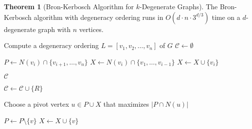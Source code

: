\documentclass{article}
\theoremstyle{definition}
\newtheorem{theorem}{Theorem}
\begin{document}
\begin{theorem}[Bron-Kerbosch Algorithm for $k$-Degenerate Graphs]
The Bron-Kerbosch algorithm with degeneracy ordering runs in $O(d \cdot n \cdot 3^{d/3})$ time on a $d$-degenerate graph with $n$ vertices.
\end{theorem}

\begin{algorithm}
\caption{Bron-Kerbosch Algorithm for $d$-Degenerate Graphs}
\label{alg:bron-kerbosch-degenerate}
\begin{algorithmic}[1]
        \State Compute a degeneracy ordering $L = [v_1, v_2, \ldots, v_n]$ of $G$
        \State $\mathcal{C} \gets \emptyset$ 
        
            \State $P \gets N(v_i) \cap \{v_{i+1}, \ldots, v_n\}$ 
            \State $X \gets N(v_i) \cap \{v_1, \ldots, v_{i-1}\}$ 
            \State {}
            \State $X \gets X \cup \{v_i\}$ 
        \EndFor
        
        \State \Return $\mathcal{C}$ 
    \EndProcedure
    
    \Statex
            \State $\mathcal{C} \gets \mathcal{C} \cup \{R\}$ 
            \State \Return
        \EndIf
        
        \State Choose a pivot vertex $u \in P \cup X$ that maximizes $|P \cap N(u)|$
        
            \State {}
            \State $P \gets P \setminus \{v\}$
            \State $X \gets X \cup \{v\}$
        \EndFor
    \EndProcedure
\end{algorithmic}
\end{algorithm}
\end{document}
